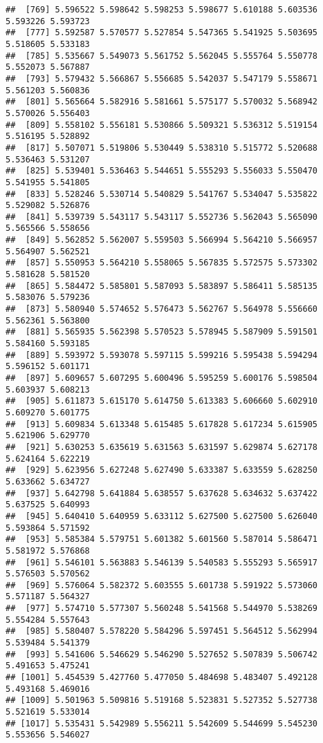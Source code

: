 \documentclass[
]{article}
\begin{document}
\begin{verbatim}
##  [769] 5.596522 5.598642 5.598253 5.598677 5.610188 5.603536 5.593226 5.593723
##  [777] 5.592587 5.570577 5.527854 5.547365 5.541925 5.503695 5.518605 5.533183
##  [785] 5.535667 5.549073 5.561752 5.562045 5.555764 5.550778 5.552073 5.567887
##  [793] 5.579432 5.566867 5.556685 5.542037 5.547179 5.558671 5.561203 5.560836
##  [801] 5.565664 5.582916 5.581661 5.575177 5.570032 5.568942 5.570026 5.556403
##  [809] 5.558102 5.556181 5.530866 5.509321 5.536312 5.519154 5.516195 5.528892
##  [817] 5.507071 5.519806 5.530449 5.538310 5.515772 5.520688 5.536463 5.531207
##  [825] 5.539401 5.536463 5.544651 5.555293 5.556033 5.550470 5.541955 5.541805
##  [833] 5.528246 5.530714 5.540829 5.541767 5.534047 5.535822 5.529082 5.526876
##  [841] 5.539739 5.543117 5.543117 5.552736 5.562043 5.565090 5.565566 5.558656
##  [849] 5.562852 5.562007 5.559503 5.566994 5.564210 5.566957 5.564907 5.562521
##  [857] 5.550953 5.564210 5.558065 5.567835 5.572575 5.573302 5.581628 5.581520
##  [865] 5.584472 5.585801 5.587093 5.583897 5.586411 5.585135 5.583076 5.579236
##  [873] 5.580940 5.574652 5.576473 5.562767 5.564978 5.556660 5.562361 5.563800
##  [881] 5.565935 5.562398 5.570523 5.578945 5.587909 5.591501 5.584160 5.593185
##  [889] 5.593972 5.593078 5.597115 5.599216 5.595438 5.594294 5.596152 5.601171
##  [897] 5.609657 5.607295 5.600496 5.595259 5.600176 5.598504 5.603937 5.608213
##  [905] 5.611873 5.615170 5.614750 5.613383 5.606660 5.602910 5.609270 5.601775
##  [913] 5.609834 5.613348 5.615485 5.617828 5.617234 5.615905 5.621906 5.629770
##  [921] 5.630253 5.635619 5.631563 5.631597 5.629874 5.627178 5.624164 5.622219
##  [929] 5.623956 5.627248 5.627490 5.633387 5.633559 5.628250 5.633662 5.634727
##  [937] 5.642798 5.641884 5.638557 5.637628 5.634632 5.637422 5.637525 5.640993
##  [945] 5.640410 5.640959 5.633112 5.627500 5.627500 5.626040 5.593864 5.571592
##  [953] 5.585384 5.579751 5.601382 5.601560 5.587014 5.586471 5.581972 5.576868
##  [961] 5.546101 5.563883 5.546139 5.540583 5.555293 5.565917 5.576503 5.570562
##  [969] 5.576064 5.582372 5.603555 5.601738 5.591922 5.573060 5.571187 5.564327
##  [977] 5.574710 5.577307 5.560248 5.541568 5.544970 5.538269 5.554284 5.557643
##  [985] 5.580407 5.578220 5.584296 5.597451 5.564512 5.562994 5.539484 5.541379
##  [993] 5.541606 5.546629 5.546290 5.527652 5.507839 5.506742 5.491653 5.475241
## [1001] 5.454539 5.427760 5.477050 5.484698 5.483407 5.492128 5.493168 5.469016
## [1009] 5.501963 5.509816 5.519168 5.523831 5.527352 5.527738 5.521619 5.533014
## [1017] 5.535431 5.542989 5.556211 5.542609 5.544699 5.545230 5.553656 5.546027

\end{verbatim}
\end{document}
